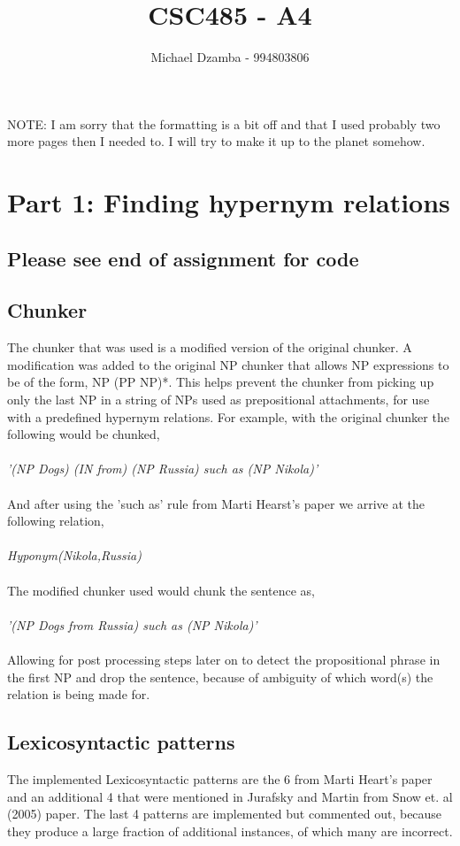 \documentclass[11pt]{article}
\begin{document}
\title{CSC485 - A4}
\author{Michael Dzamba - 994803806}

\maketitle \tiny
NOTE: I am sorry that the formatting is a bit off and that I used probably two more pages then I needed to. I will try to make it up to the planet somehow. \normalsize

\section{Part 1: Finding hypernym relations}
\subsection{Please see end of assignment for code}
\subsection{Chunker}
The chunker that was used is a modified version of the original chunker. A modification was added to the original NP chunker that allows NP expressions to be of the form, NP (PP NP)*. This helps prevent the chunker from picking up only the last NP in a string of NPs used as prepositional attachments, for use with a predefined hypernym relations. For example, with the original chunker the following would be chunked,\\ \\
\textit{'(NP Dogs) (IN from) (NP Russia) such as (NP Nikola)'} \\ \\
And after using the 'such as' rule from Marti Hearst's paper we arrive at the following relation,\\ \\
\textit{Hyponym(Nikola,Russia)} \\ \\
The modified chunker used would chunk the sentence as, \\ \\
\textit{'(NP Dogs from Russia) such as (NP Nikola)'} \\ \\
Allowing for post processing steps later on to detect the propositional phrase in the first NP and drop the sentence, because of ambiguity of which word(s) the relation is being made for.
\subsection{Lexicosyntactic patterns}
The implemented Lexicosyntactic patterns are the 6 from Marti Heart's paper and an additional 4 that were mentioned in Jurafsky and Martin from Snow et. al (2005) paper. The last 4 patterns are implemented but commented out, because they produce a large fraction of additional instances, of which many are incorrect.
\end{document}

